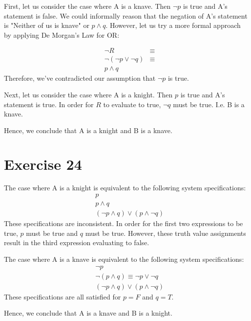 \documentclass{article}
\begin{document}
First, let us consider the case where A is a knave. Then $\neg p$ is true and A's statement is false. We could informally reason that the negation of A's statement is "Neither of us is knave" or $p \land q$. However, let us try a more formal approach by applying De Morgan's Law for OR:

\begin{align*}
	 & \neg R                    & \equiv \\
	 & \neg (\neg p \lor \neg q) & \equiv \\
	 & p \land q
\end{align*}
Therefore, we've contradicted our assumption that $\neg p$ is true.

Next, let us consider the case where A is a knight. Then $p$ is true and A's statement is true.  In order for $R$ to evaluate to true, $\neg q$ must be true. I.e. B is a knave.

Hence, we conclude that A is a knight and B is a knave.

\pagebreak

\section{Exercise 24}
The case where A is a knight is equivalent to the following system specifications:
\begin{align*}
	 & p                                      \\
	 & p \land q                              \\
	 & (\neg p \land q) \lor (p \land \neg q)
\end{align*}
These specifications are inconsistent.  In order for the first two expressions to be true, $p$ must be true and $q$ must be true. However, these truth value assignments result in the third expression evaluating to false.

The case where A is a knave is equivalent to the following system specifications:
\begin{align*}
	 & \neg p                                     \\
	 & \neg (p \land q) \equiv \neg p \lor \neg q \\
	 & (\neg p \land q) \lor (p \land \neg q)
\end{align*}
These specifications are all satisfied for $p = F$ and $q = T$.

Hence, we conclude that A is a knave and B is a knight.

\pagebreak
\end{document}
